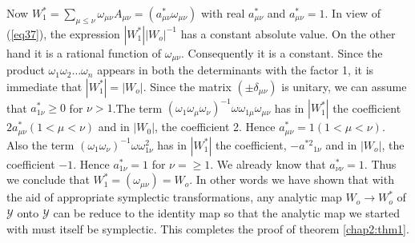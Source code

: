 \setcounter{pageoriginal}{27}
 Now $W^*_1 = \sum_{\mu \le \nu} \omega_{\mu \nu} A_{\mu \nu} =
 (a^*_{\mu \nu} \omega _{\mu \nu})$ with real $a^*_{\mu \nu}$ and $a^*
 _{\mu \nu}=1$. In view of (\ref{eq37}), the expression $|W^*_1||W_o|^{-1}$
 has a constant absolute value. On the other hand it is a rational
 function of $\omega_{\mu \nu}$. Consequently it is a constant. Since
 the product $\omega_1 \omega_2 \dots \omega_n$ appears in both the
 determinants with the factor 1, it is immediate that $|W^*_1| =
 |W_o|$. Since the matrix $(\pm \delta_{\mu \nu})$ is unitary, we can
 assume that $a^*_{1 \nu} \geq 0$ for $\nu > 1$.\pageoriginale The
 term $(\omega_1 
 \omega_\mu \omega_\nu)^{-1} \omega \omega_{1 \mu} \omega_{\mu \nu}$
 has in $|W^\ast_1|$ the coefficient $2 a^\ast_{\mu \nu}(1 < \mu <
 \nu)$ and in $|W_0|$, the coefficient 2. Hence 
 $a^*_{\mu \nu} = 1 ( 1 < \mu < \nu)$.  Also the term $(\omega_1
 \omega_\nu)^{-1} \omega \omega^2_{1 \nu}$ has in $|W^*_1|$ the
 coefficient, $-a{^{*{2}}}_{1 \nu}$ and in $|W_o|$, the coefficient
 $-1$. Hence $a^*_{1 \nu}=1$ for $\nu = \ge 1$. We already know that
 $a^*_{\nu \nu} = 1$. Thus we conclude that $W^*_1 = (\omega_{\mu
   \nu}) = W_o$. In other words we have shown that with the aid of
 appropriate symplectic transformations, any analytic map $W_o \to
 W^*_o$ of $\mathscr{Y}$ onto $\mathscr{Y}$ can be reduce to
 the identity  map so that the analytic map we started with must
 itself be symplectic. This completes the proof of theorem
 \ref{chap2:thm1}.  
 

